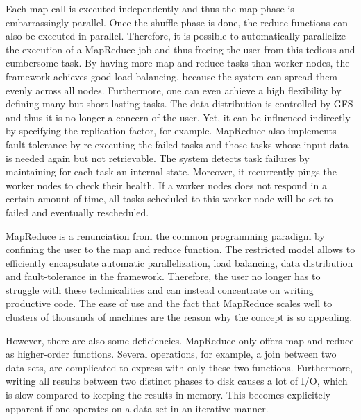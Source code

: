 Each map call is executed independently and thus the map phase is embarrassingly parallel.
Once the shuffle phase is done, the reduce functions can also be executed in parallel.
Therefore, it is possible to automatically parallelize the execution of a MapReduce job and thus freeing the user from this tedious and cumbersome task.
By having more map and reduce tasks than worker nodes, the framework achieves good load balancing, because the system can spread them evenly across all nodes.
Furthermore, one can even achieve a high flexibility by defining many but short lasting tasks.
The data distribution is controlled by GFS and thus it is no longer a concern of the user.
Yet, it can be influenced indirectly by specifying the replication factor, for example.
MapReduce also implements fault-tolerance by re-executing the failed tasks and those tasks whose input data is needed again but not retrievable.
The system detects task failures by maintaining for each task an internal state.
Moreover, it recurrently pings the worker nodes to check their health.
If a worker nodes does not respond in a certain amount of time, all tasks scheduled to this worker node will be set to failed and eventually rescheduled.

MapReduce is a renunciation from the common programming paradigm by confining the user to the map and reduce function.
The restricted model allows \textcite{dean:c2008a} to efficiently encapsulate automatic parallelization, load balancing, data distribution and fault-tolerance in the framework.
Therefore, the user no longer has to struggle with these technicalities and can instead concentrate on writing productive code.
The ease of use and the fact that MapReduce scales well to clusters of thousands of machines are the reason why the concept is so appealing.

However, there are also some deficiencies.
MapReduce only offers map and reduce as higher-order functions.
Several operations, for example, a join between two data sets, are complicated to express with only these two functions.
Furthermore, writing all results between two distinct phases to disk causes a lot of I/O, which is slow compared to keeping the results in memory.
This becomes explicitely apparent if one operates on a data set in an iterative manner.

